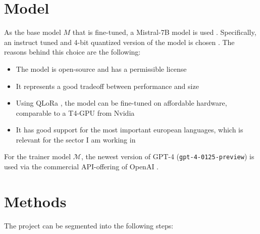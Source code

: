\documentclass[11pt]{article}
\begin{document}
    \section{Model}\label{S:model}
    As the base model $M$ that is fine-tuned, a Mistral-7B model is used \cite{jiang_mistral_2023}.
    Specifically, an instruct tuned and 4-bit quantized version of the model is chosen \cite{unsloth_unslothmistral-7b-instruct-v02-bnb-4bit_2024}.
    The reasons behind this choice are the following:
    \begin{itemize}
        \item The model is open-source and has a permissible license
        \item It represents a good tradeoff between performance and size
        \item Using QLoRa \cite{dettmers_qlora_2023, hu_lora_2021}, the model can be fine-tuned on affordable hardware, comparable to a T4-GPU from Nvidia
        \item It has good support for the most important european languages, which is relevant for the sector I am working in
    \end{itemize}

    For the trainer model $\mathcal{M}$, the newest version of GPT-4 (\texttt{gpt-4-0125-preview}) is used via the
    commercial API-offering of OpenAI \cite{openai_gpt-4_2024}.


    \section{Methods}\label{S:methods}

    The project can be segmented into the following steps:
\end{document}
